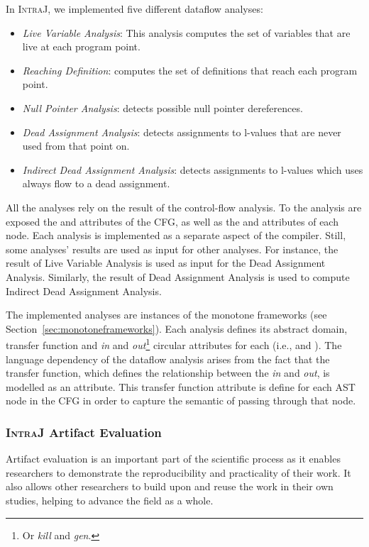 In \textsc{IntraJ}, we implemented five different dataflow analyses:
\begin{itemize}
  \item \emph{Live Variable Analysis}: This analysis computes the set of variables that are live at each program point.
  \item \emph{Reaching Definition}: computes the set of definitions that reach each program point.
  \item \emph{Null Pointer Analysis}: detects possible null pointer dereferences.
  \item \emph{Dead Assignment Analysis}: detects assignments to l-values that are never used from that point on.
  \item \emph{Indirect Dead Assignment Analysis}: detects assignments to l-values which uses always flow to a dead assignment.
\end{itemize}
All the analyses rely on the result of the control-flow analysis. To the analysis are exposed
the  and  attributes of the CFG, as well as the  and 
attributes of each node.
Each analysis is implemented as a separate aspect of the compiler. 
Still, some analyses' results are used as input for other analyses. For instance,
the result of Live Variable Analysis is used as input for the Dead Assignment Analysis.
Similarly, the result of Dead Assignment Analysis is used to compute Indirect Dead Assignment Analysis.

The implemented analyses are instances of the monotone frameworks (see Section~\ref{sec:monotoneframeworks}).
Each analysis defines its abstract domain, transfer function and \emph{in} and
\emph{out}\footnote{Or \emph{kill} and \emph{gen}.} circular attributes for each  (i.e.,  and  ).
The language dependency of the dataflow analysis arises from the fact that the
transfer function, which defines the relationship between the \emph{in} and \emph{out},
is modelled as an attribute. This transfer function attribute is
define for each AST node in the CFG in order to capture the semantic of passing
through that node.


\subsubsection{\textsc{IntraJ} Artifact Evaluation}
Artifact evaluation is an important part of the scientific process as it enables
researchers to demonstrate the reproducibility and practicality of their work.
It also allows other researchers to build upon and reuse the work in their own
studies, helping to advance the field as a whole.

